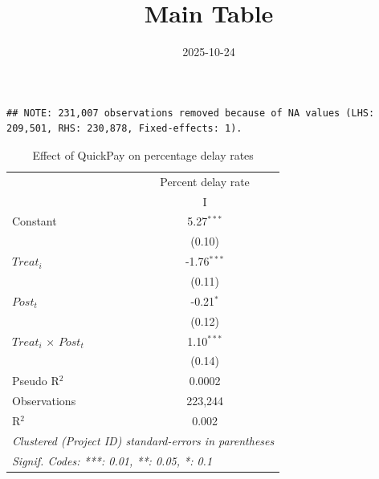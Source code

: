 \documentclass[
]{article}
\title{Main Table}
\author{}
\date{\vspace{-2.5em}2025-10-24}
\begin{document}
\maketitle

\begin{verbatim}
## NOTE: 231,007 observations removed because of NA values (LHS: 209,501, RHS: 230,878, Fixed-effects: 1).
\end{verbatim}

\begin{table}[htbp]
   \caption{Effect of QuickPay on percentage delay rates}
   \centering
   \small
   \begin{tabular}{lc}
      \toprule
                                   & Percent delay rate\\  
                                   & I\\  
      \midrule 
      Constant                     & 5.27$^{***}$\\   
                                   & (0.10)\\   
      $Treat_i$                    & -1.76$^{***}$\\   
                                   & (0.11)\\   
      $Post_t$                     & -0.21$^{*}$\\   
                                   & (0.12)\\   
      $Treat_i$ $\times$ $Post_t$  & 1.10$^{***}$\\   
                                   & (0.14)\\   
      Pseudo R$^2$                 & 0.0002\\  
      Observations                 & 223,244\\  
      R$^2$                        & 0.002\\  
      \midrule
      \multicolumn{2}{l}{\emph{Clustered (Project ID) standard-errors in parentheses}}\\
      \multicolumn{2}{l}{\emph{Signif. Codes: ***: 0.01, **: 0.05, *: 0.1}}\\
   \end{tabular}
\end{table}
\end{document}
